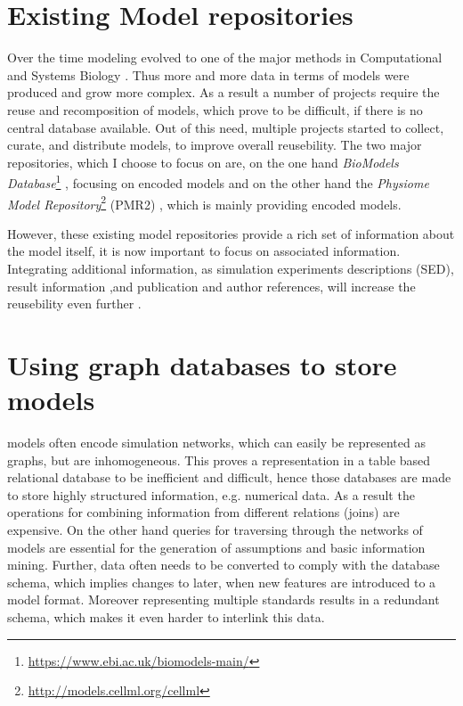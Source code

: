 \section{Existing Model repositories}
Over the time modeling evolved to one of the major methods in Computational and Systems Biology \cite{Finkelstein2004}. Thus more and more data in terms of models were produced and grow more complex. \cite{Henkel2010} As a result a number of projects require the reuse and recomposition of models, which prove to be difficult, if there is no central database available. \cite{Waltemath2013}
Out of this need, multiple projects started to collect, curate, and distribute models, to improve overall reusebility.
The two major repositories, which I choose to focus on are, on the one hand \emph{BioModels Database}\footnote{\url{https://www.ebi.ac.uk/biomodels-main/}} \cite{Li2010}, focusing on \sbml encoded models and on the other hand the \emph{Physiome Model Repository}\footnote{\url{http://models.cellml.org/cellml}} (PMR2) \cite{Yu2011}, which is mainly providing \cellml encoded models.

However, these existing model repositories provide a rich set of information about the model itself, it is now important to focus on associated information. Integrating additional information, as simulation experiments descriptions (SED), result information ,and publication and author references, will increase the reusebility even further \cite{Waltemath2013,Henkel2012}.

\section{Using graph databases to store \sysbio models}
\label{sec:backgroung:graph-db}
\sysbio models often encode simulation networks, which can easily be represented as graphs, but are inhomogeneous. This proves a representation in a table based relational database to be inefficient and difficult, hence those databases are made to store highly structured information, e.g. numerical data. As a result the operations for combining information from different relations (joins) are expensive. On the other hand queries for traversing through the networks of models are essential for the generation of assumptions and basic information mining. Further, data often needs to be converted to comply with the database schema, which implies changes to later, when new features are introduced to a model format. Moreover representing multiple standards results in a redundant schema, which makes it even harder to interlink this data. \cite{Lysenko2016}

